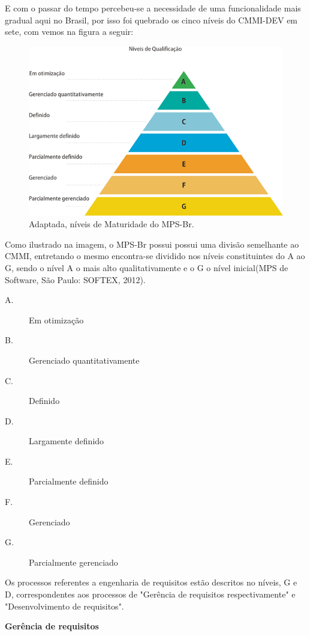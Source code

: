 E com o passar do tempo percebeu-se a necessidade de uma funcionalidade mais gradual aqui no Brasil, por isso foi quebrado os cinco níveis do CMMI-DEV em sete, com vemos na figura a seguir:
  \begin{figure}[!htbp]
    \centering
    \includegraphics[scale=0.5]{figuras/650x432xniveis_de_qualificacao}
    \caption[Níveis de Maturidade do MPS-Br]{Adaptada, níveis de Maturidade do MPS-Br. \footnotemark}
    \label{niveis-maturidade-mps-br}
  \end{figure}
  
Como ilustrado na imagem, o MPS-Br possui possui uma divisão semelhante ao CMMI, entretando o mesmo encontra-se dividido nos níveis constituintes do A ao G, sendo o nível A o mais alto qualitativamente e o G o nível inicial(MPS de Software, São Paulo: SOFTEX, 2012).	
\begin{description}
\item[A.] Em otimização
\item[B.] Gerenciado quantitativamente
\item[C.] Definido
\item[D.] Largamente definido
\item[E.] Parcialmente definido
\item[F.] Gerenciado
\item[G.] Parcialmente gerenciado	
\end{description}			

Os processos referentes a engenharia de requisitos estão descritos no níveis, G e D, correspondentes aos processos de "Gerência de requisitos respectivamente" e "Desenvolvimento de requisitos".

\textbf{Gerência de requisitos}

